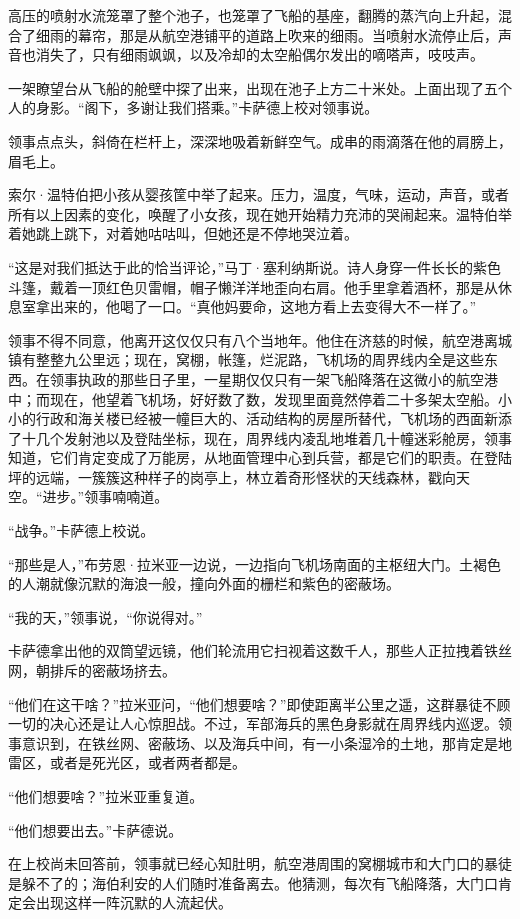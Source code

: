 \documentclass[AutoFakeBold=true]{book}
\begin{document}
高压的喷射水流笼罩了整个池子，也笼罩了飞船的基座，翻腾的蒸汽向上升起，混合了细雨的幕帘，那是从航空港铺平的道路上吹来的细雨。当喷射水流停止后，声音也消失了，只有细雨飒飒，以及冷却的太空船偶尔发出的嘀嗒声，吱吱声。

一架瞭望台从飞船的舱壁中探了出来，出现在池子上方二十米处。上面出现了五个人的身影。``阁下，多谢让我们搭乘。''卡萨德上校对领事说。

领事点点头，斜倚在栏杆上，深深地吸着新鲜空气。成串的雨滴落在他的肩膀上，眉毛上。

索尔·温特伯把小孩从婴孩筐中举了起来。压力，温度，气味，运动，声音，或者所有以上因素的变化，唤醒了小女孩，现在她开始精力充沛的哭闹起来。温特伯举着她跳上跳下，对着她咕咕叫，但她还是不停地哭泣着。

``这是对我们抵达于此的恰当评论，''马丁·塞利纳斯说。诗人身穿一件长长的紫色斗篷，戴着一顶红色贝雷帽，帽子懒洋洋地歪向右肩。他手里拿着酒杯，那是从休息室拿出来的，他喝了一口。``真他妈要命，这地方看上去变得大不一样了。''

领事不得不同意，他离开这仅仅只有八个当地年。他住在济慈的时候，航空港离城镇有整整九公里远；现在，窝棚，帐篷，烂泥路，飞机场的周界线内全是这些东西。在领事执政的那些日子里，一星期仅仅只有一架飞船降落在这微小的航空港中；而现在，他望着飞机场，好好数了数，发现里面竟然停着二十多架太空船。小小的行政和海关楼已经被一幢巨大的、活动结构的房屋所替代，飞机场的西面新添了十几个发射池以及登陆坐标，现在，周界线内凌乱地堆着几十幢迷彩舱房，领事知道，它们肯定变成了万能房，从地面管理中心到兵营，都是它们的职责。在登陆坪的远端，一簇簇这种样子的岗亭上，林立着奇形怪状的天线森林，戳向天空。``进步。''领事喃喃道。

``战争。''卡萨德上校说。

``那些是人，''布劳恩·拉米亚一边说，一边指向飞机场南面的主枢纽大门。土褐色的人潮就像沉默的海浪一般，撞向外面的栅栏和紫色的密蔽场。

``我的天，''领事说，``你说得对。''

卡萨德拿出他的双筒望远镜，他们轮流用它扫视着这数千人，那些人正拉拽着铁丝网，朝排斥的密蔽场挤去。

``他们在这干啥？''拉米亚问，``他们想要啥？''即使距离半公里之遥，这群暴徒不顾一切的决心还是让人心惊胆战。不过，军部海兵的黑色身影就在周界线内巡逻。领事意识到，在铁丝网、密蔽场、以及海兵中间，有一小条湿冷的土地，那肯定是地雷区，或者是死光区，或者两者都是。

``他们想要啥？''拉米亚重复道。

``他们想要出去。''卡萨德说。

在上校尚未回答前，领事就已经心知肚明，航空港周围的窝棚城市和大门口的暴徒是躲不了的；海伯利安的人们随时准备离去。他猜测，每次有飞船降落，大门口肯定会出现这样一阵沉默的人流起伏。
\end{document}
